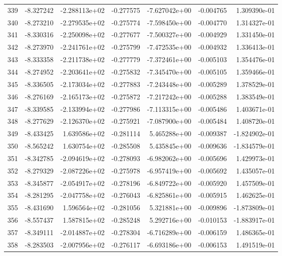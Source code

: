 \begin{tabular}{rrrrrrr}
 339 &  -8.327242 & -2.288113e+02 & -0.277575 & -7.627042e+00 &   -0.004765 &  1.309390e-01 \\
 340 &  -8.273210 & -2.279535e+02 & -0.275774 & -7.598450e+00 &   -0.004770 &  1.314327e-01 \\
 341 &  -8.330316 & -2.250098e+02 & -0.277677 & -7.500327e+00 &   -0.004929 &  1.331450e-01 \\
 342 &  -8.273970 & -2.241761e+02 & -0.275799 & -7.472535e+00 &   -0.004932 &  1.336413e-01 \\
 343 &  -8.333358 & -2.211738e+02 & -0.277779 & -7.372461e+00 &   -0.005103 &  1.354476e-01 \\
 344 &  -8.274952 & -2.203641e+02 & -0.275832 & -7.345470e+00 &   -0.005105 &  1.359466e-01 \\
 345 &  -8.336505 & -2.173034e+02 & -0.277883 & -7.243448e+00 &   -0.005289 &  1.378529e-01 \\
 346 &  -8.276169 & -2.165173e+02 & -0.275872 & -7.217242e+00 &   -0.005288 &  1.383549e-01 \\
 347 &  -8.339585 & -2.133994e+02 & -0.277986 & -7.113315e+00 &   -0.005486 &  1.403671e-01 \\
 348 &  -8.277629 & -2.126370e+02 & -0.275921 & -7.087900e+00 &   -0.005484 &  1.408720e-01 \\
 349 &  -8.433425 &  1.639586e+02 & -0.281114 &  5.465288e+00 &   -0.009387 & -1.824902e-01 \\
 350 &  -8.565242 &  1.630754e+02 & -0.285508 &  5.435845e+00 &   -0.009636 & -1.834579e-01 \\
 351 &  -8.342785 & -2.094619e+02 & -0.278093 & -6.982062e+00 &   -0.005696 &  1.429973e-01 \\
 352 &  -8.279329 & -2.087226e+02 & -0.275978 & -6.957419e+00 &   -0.005692 &  1.435057e-01 \\
 353 &  -8.345877 & -2.054917e+02 & -0.278196 & -6.849722e+00 &   -0.005920 &  1.457509e-01 \\
 354 &  -8.281295 & -2.047758e+02 & -0.276043 & -6.825861e+00 &   -0.005915 &  1.462625e-01 \\
 355 &  -8.431690 &  1.596564e+02 & -0.281056 &  5.321881e+00 &   -0.009896 & -1.873809e-01 \\
 356 &  -8.557437 &  1.587815e+02 & -0.285248 &  5.292716e+00 &   -0.010153 & -1.883917e-01 \\
 357 &  -8.349111 & -2.014887e+02 & -0.278304 & -6.716289e+00 &   -0.006159 &  1.486365e-01 \\
 358 &  -8.283503 & -2.007956e+02 & -0.276117 & -6.693186e+00 &   -0.006153 &  1.491519e-01 \\

\end{tabular}

